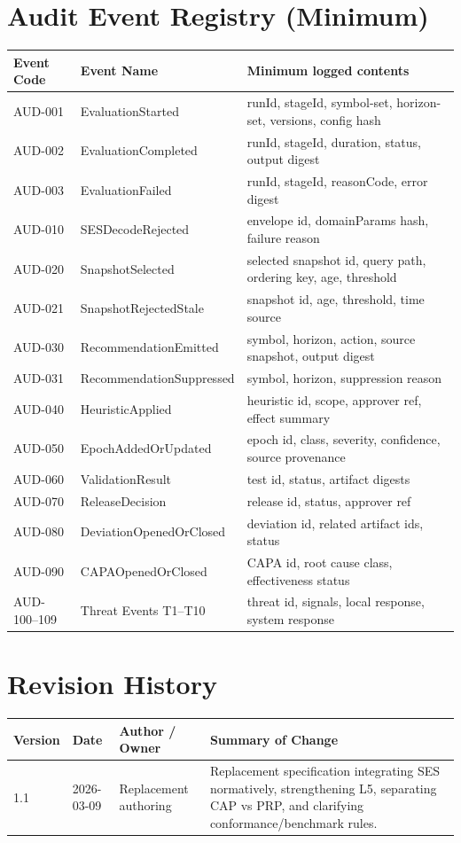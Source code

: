 \documentclass[11pt]{report}
\begin{document}
\chapter{Audit Event Registry (Minimum)}
\begin{longtable}{p{}p{}p{}}
\toprule
Event Code & Event Name & Minimum logged contents \\
\midrule
AUD-001 & EvaluationStarted & runId, stageId, symbol-set, horizon-set, versions, config hash \\
AUD-002 & EvaluationCompleted & runId, stageId, duration, status, output digest \\
AUD-003 & EvaluationFailed & runId, stageId, reasonCode, error digest \\
AUD-010 & SESDecodeRejected & envelope id, domainParams hash, failure reason \\
AUD-020 & SnapshotSelected & selected snapshot id, query path, ordering key, age, threshold \\
AUD-021 & SnapshotRejectedStale & snapshot id, age, threshold, time source \\
AUD-030 & RecommendationEmitted & symbol, horizon, action, source snapshot, output digest \\
AUD-031 & RecommendationSuppressed & symbol, horizon, suppression reason \\
AUD-040 & HeuristicApplied & heuristic id, scope, approver ref, effect summary \\
AUD-050 & EpochAddedOrUpdated & epoch id, class, severity, confidence, source provenance \\
AUD-060 & ValidationResult & test id, status, artifact digests \\
AUD-070 & ReleaseDecision & release id, status, approver ref \\
AUD-080 & DeviationOpenedOrClosed & deviation id, related artifact ids, status \\
AUD-090 & CAPAOpenedOrClosed & CAPA id, root cause class, effectiveness status \\
AUD-100--109 & Threat Events T1--T10 & threat id, signals, local response, system response \\
\bottomrule
\end{longtable}

\chapter{Revision History}
\begin{longtable}{p{}p{}p{}p{}}
\toprule
Version & Date & Author / Owner & Summary of Change \\
\midrule
1.1 & 2026-03-09 & Replacement authoring & Replacement specification integrating SES normatively, strengthening L5, separating CAP vs PRP, and clarifying conformance/benchmark rules. \\
\bottomrule
\end{longtable}
\end{document}
